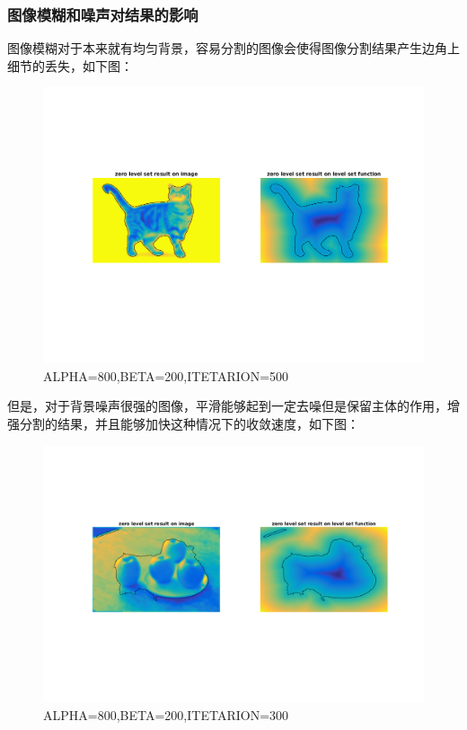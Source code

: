 \documentclass[a4paper, UTF8]{ctexrep}
\begin{document}
		\subsubsection{图像模糊和噪声对结果的影响} %
		\label{ssub:图像模糊对结果的影响}
			图像模糊对于本来就有均匀背景，容易分割的图像会使得图像分割结果产生边角上细节的丢失，如下图：
			\begin{figure}[htbp!]
				\centering
				\includegraphics[width=\textwidth]{hw3_fig11.png}
				\caption{ALPHA=800,BETA=200,ITETARION=500}
				\label{fig:figure1}
			\end{figure}
			\clearpage
			但是，对于背景噪声很强的图像，平滑能够起到一定去噪但是保留主体的作用，增强分割的结果，并且能够加快这种情况下的收敛速度，如下图：
			\begin{figure}[htbp!]
				\centering
				\includegraphics[width=\textwidth]{hw3_fig12.png}
				\caption{ALPHA=800,BETA=200,ITETARION=300}
				\label{fig:figure1}
			\end{figure}
\end{document}
